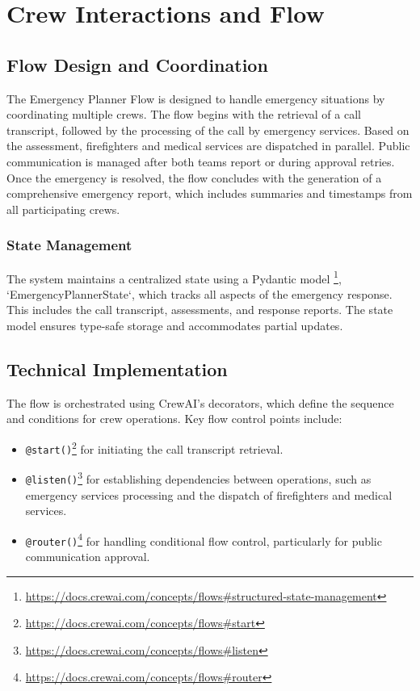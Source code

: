 \section{Crew Interactions and Flow}
\label{sec:crew_interaction}

\subsection{Flow Design and Coordination}
The Emergency Planner Flow is designed to handle emergency situations by coordinating multiple crews. The flow begins with the retrieval of a call transcript, followed by the processing of the call by emergency services. Based on the assessment, firefighters and medical services are dispatched in parallel. Public communication is managed after both teams report or during approval retries. Once the emergency is resolved, the flow concludes with the generation of a comprehensive emergency report, which includes summaries and timestamps from all participating crews.

\subsubsection{State Management}
The system maintains a centralized state using a Pydantic model \footnote{\url{https://docs.crewai.com/concepts/flows\#structured-state-management}}, `EmergencyPlannerState`, which tracks all aspects of the emergency response. This includes the call transcript, assessments, and response reports. The state model ensures type-safe storage and accommodates partial updates.

\subsection{Technical Implementation}
The flow is orchestrated using CrewAI's decorators, which define the sequence and conditions for crew operations. Key flow control points include:

\begin{itemize}
    \item \texttt{@start()}\footnote{\url{https://docs.crewai.com/concepts/flows\#start}} for initiating the call transcript retrieval.
    \item \texttt{@listen()}\footnote{\url{https://docs.crewai.com/concepts/flows\#listen}} for establishing dependencies between operations, such as emergency services processing and the dispatch of firefighters and medical services.
    \item \texttt{@router()}\footnote{\url{https://docs.crewai.com/concepts/flows\#router}} for handling conditional flow control, particularly for public communication approval.
\end{itemize}


